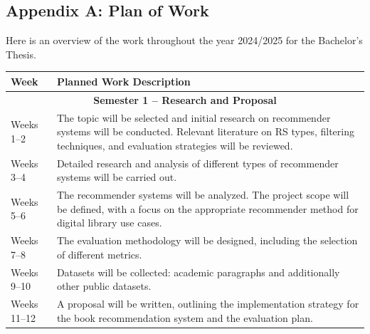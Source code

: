 \documentclass[\myFontSize,a4paper,oneside,hidelinks]{article}
\begin{document}

\clearpage
\appendix

\renewcommand{\thepage}{A-\arabic{page}}
\setcounter{page}{1}
\subsection*{Appendix A: Plan of Work} %
\renewcommand{\refname}{}

Here is an overview of the work throughout the year 2024/2025 for the Bachelor's Thesis.

\begin{longtable}{|p{2.5cm}|p{12cm}|}
\hline
\textbf{Week} & \textbf{Planned Work Description} \\
\hline
\multicolumn{2}{|c|}{\textbf{Semester 1 – Research and Proposal}} \\
\hline
Weeks 1--2 & The topic will be selected and initial research on recommender systems will be conducted. Relevant literature on RS types, filtering techniques, and evaluation strategies will be reviewed. \\
\hline
Weeks 3--4 & Detailed research and analysis of different types of recommender systems will be carried out. \\
\hline
Weeks 5--6 & The recommender systems will be analyzed. The project scope will be defined, with a focus on the appropriate recommender method for digital library use cases. \\
\hline
Weeks 7--8 & The evaluation methodology will be designed, including the selection of different metrics. \\
\hline
Weeks 9--10 & Datasets will be collected: academic paragraphs and additionally other public datasets. \\
\hline
Weeks 11--12 & A proposal will be written, outlining the implementation strategy for the book recommendation system and the evaluation plan. \\
\hline


\end{longtable}
\end{document}
